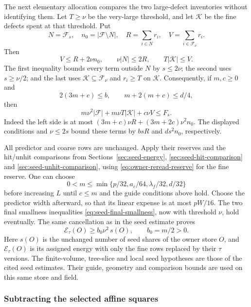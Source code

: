The next elementary allocation compares the two large-defect
inventories without identifying them. Let $T\ge\nu$ be the
very-large threshold, and let $\mathcal K$ be the fine defects
spent at that threshold. Put
\[
 N=\mathcal F_s,\quad n_0=|\mathcal F\setminus N|,
 \quad R=\sum_{i\in N}r_i,\quad
 V=\sum_{i\in\mathcal F_\nu}r_i.
\]
Then
\[
 V\le R+2\nu n_0,\qquad
 \nu|N|\le2R,\qquad T|\mathcal K|\le V.
\]
The first inequality bounds every term outside $N$ by
$s\le2\nu$; the second uses $s\ge\nu/2$; and the last
uses $\mathcal K\subseteq\mathcal F_\nu$ and
$r_i\ge T$ on $\mathcal K$. Consequently, if $m,c\ge0$
and
\[
 2(3m+c)\le b,\qquad m+2(m+c)\le d/4,
\]
then
\begin{equation}\label{eq:owner-reread-reserve}
 m\nu^2|\mathcal F|+m\nu T|\mathcal K|+c\nu V
       \le F_s.
\end{equation}
Indeed the left side is at most
$(3m+c)\nu R+(3m+2c)\nu^2n_0$.
The displayed conditions and $\nu\le2s$ bound these terms by
$bsR$ and $ds^2n_0$, respectively.

All predictor and coarse rows are unchanged. Apply their reserves
and the hit/unhit comparisons from
Sections~\ref{sec:seed-energy}, \ref{sec:seed-hit-comparison}
and \ref{sec:seed-unhit-comparison}, using
\eqref{eq:owner-reread-reserve} for the fine reserve.
One can choose
\[
 0<m\le\min\{p/32,a_c/64,\lambda_f/32,d/32\}
\]
before increasing $L$ until $c\le m$ and the guide conditions
above hold. Choose the predictor width afterward, so that its
linear expense is at most $pW/16$. The two final smallness
inequalities \eqref{eq:seed-final-smallness}, now with threshold
$\nu$, hold eventually. The same cancellation as in the seed
estimate proves
\begin{equation}\label{eq:owner-rank-income}
 \mathcal E_\tau(O)\ge b_0\nu^2\,s(O),\qquad b_0=m/2>0.
\end{equation}
Here $s(O)$ is the unchanged number of seed shares of the owner
store $O$, and $\mathcal E_\tau(O)$ is its assigned energy
with only the fine rows replaced by their $\tau$ versions.
The finite-volume, tree-slice and local seed hypotheses are those
of the cited seed estimates. Their guide, geometry and comparison
bounds are used on this same store and field.

\subsubsection{Subtracting the selected affine squares}

